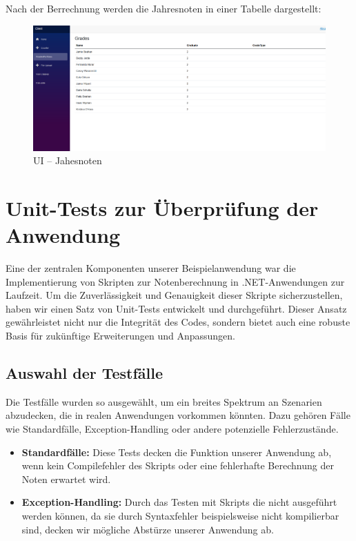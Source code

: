 Nach der Berrechnung werden die Jahresnoten in einer Tabelle dargestellt:

\begin{figure}[H]
    \centering
    \includegraphics[scale=0.5]{pics/GradesForClass.png}
    \caption{UI -- Jahesnoten}
    \label{fig:impl:GradesForClass}
\end{figure}



\newpage
\section{Unit-Tests zur Überprüfung der Anwendung}

Eine der zentralen Komponenten unserer Beispielanwendung war die Implementierung von 
Skripten zur Notenberechnung in .NET-Anwendungen zur Laufzeit. Um die Zuverlässigkeit und 
Genauigkeit dieser Skripte sicherzustellen, haben wir einen Satz von Unit-Tests entwickelt 
und durchgeführt. Dieser Ansatz gewährleistet nicht nur die Integrität des Codes, 
sondern bietet auch eine robuste Basis für zukünftige Erweiterungen und Anpassungen.

\subsection*{Auswahl der Testfälle}
Die Testfälle wurden so ausgewählt, um ein breites Spektrum an Szenarien abzudecken, 
die in realen Anwendungen vorkommen könnten. Dazu gehören Fälle wie Standardfälle, Exception-Handling
oder andere potenzielle Fehlerzustände. \\

\begin{itemize}
    \item \textbf{Standardfälle:} Diese Tests decken die Funktion unserer Anwendung ab, wenn kein 
    Compilefehler des Skripts oder eine fehlerhafte Berechnung der Noten erwartet wird.
    \item  \textbf{Exception-Handling:} Durch das Testen mit Skripts die nicht ausgeführt werden 
    können, da sie durch Syntaxfehler beispielsweise nicht kompilierbar sind, decken wir 
    mögliche Abstürze unserer Anwendung ab.
\end{itemize}

